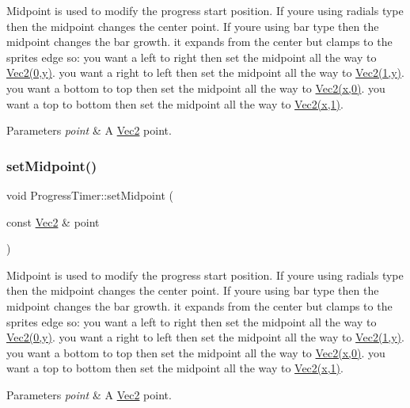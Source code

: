 Midpoint is used to modify the progress start position. If you\textquotesingle{}re using radials type then the midpoint changes the center point. If you\textquotesingle{}re using bar type then the midpoint changes the bar growth. it expands from the center but clamps to the sprites edge so\+: you want a left to right then set the midpoint all the way to \hyperlink{classVec2}{Vec2(0,y)}. you want a right to left then set the midpoint all the way to \hyperlink{classVec2}{Vec2(1,y)}. you want a bottom to top then set the midpoint all the way to \hyperlink{classVec2}{Vec2(x,0)}. you want a top to bottom then set the midpoint all the way to \hyperlink{classVec2}{Vec2(x,1)}. 
\begin{DoxyParams}{Parameters}
{\em point} & A \hyperlink{classVec2}{Vec2} point. \\
\hline
\end{DoxyParams}
\mbox{\label{classProgressTimer_a69680f76df01ea815970964cc1dc673b}} 
\subsubsection{\texorpdfstring{set\+Midpoint()}{setMidpoint()}\hspace{0.1cm}{\footnotesize\ttfamily [2/2]}}
{\footnotesize\ttfamily void Progress\+Timer\+::set\+Midpoint (\begin{DoxyParamCaption}\item[{const \hyperlink{classVec2}{Vec2} \&}]{point }\end{DoxyParamCaption})}

Midpoint is used to modify the progress start position. If you\textquotesingle{}re using radials type then the midpoint changes the center point. If you\textquotesingle{}re using bar type then the midpoint changes the bar growth. it expands from the center but clamps to the sprites edge so\+: you want a left to right then set the midpoint all the way to \hyperlink{classVec2}{Vec2(0,y)}. you want a right to left then set the midpoint all the way to \hyperlink{classVec2}{Vec2(1,y)}. you want a bottom to top then set the midpoint all the way to \hyperlink{classVec2}{Vec2(x,0)}. you want a top to bottom then set the midpoint all the way to \hyperlink{classVec2}{Vec2(x,1)}. 
\begin{DoxyParams}{Parameters}
{\em point} & A \hyperlink{classVec2}{Vec2} point. \\
\hline
\end{DoxyParams}
\mbox{\label{classProgressTimer_a9f36a7fde3a6490b81e53f23ebbd3df9}} 
